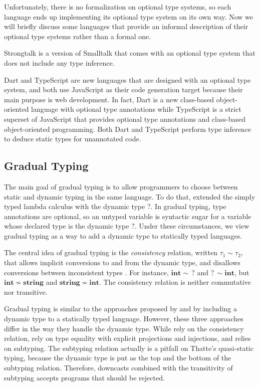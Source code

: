 \documentclass[preprint]{sig-alternate}
\begin{document}
Unfortunately, there is no formalization on optional type systems,
so each language ends up implementing its optional type system on
its own way.
Now we will briefly discuss some languages that provide an informal
description of their optional type systems rather than a formal one.

Strongtalk \citep{bracha1993strongtalk,bracha1996strongtalk} is
a version of Smalltalk that comes with an optional type system that
does not include any type inference.

Dart \citep{dart} and TypeScript \citep{typescript} are new
languages that are designed with an optional type system, and both
use JavaScript as their code generation target because their main
purpose is web development.
In fact, Dart is a new class-based object-oriented language with
optional type annotations while TypeScript is a strict superset of
JavaScript that provides optional type annotations and class-based
object-oriented programming.
Both Dart and TypeScript perform type inference to deduce static
types for unannotated code.

\subsection{Gradual Typing}

The main goal of gradual typing \citep{siek2006gradual} is to allow
programmers to choose between static and dynamic typing in the same
language.
To do that, \citet{siek2006gradual} extended the simply typed
lambda calculus with the dynamic type $?$.
In gradual typing, type annotations are optional, so an untyped
variable is syntactic sugar for a variable whose declared type is
the dynamic type $?$.
Under these circumstances, we view gradual typing as a way to add
a dynamic type to statically typed languages.

The central idea of gradual typing is the \textit{consistency}
relation, written $\tau_{1} \sim \tau_{2}$, that allows implicit
conversions to and from the dynamic type, and disallows conversions
between inconsistent types \citep{siek2006gradual}.
For instance, $\mathbf{int} \sim \,?$ and $?\, \sim \mathbf{int}$,
but $\mathbf{int} \not\sim \mathbf{string}$ and
$\mathbf{string} \not\sim \mathbf{int}$. 
The consistency relation is neither commutative nor transitive.

Gradual typing is similar to the approaches proposed by
\citet{abadi1989dts} and \citet{thatte1990qst} by including a
dynamic type to a statically typed language.
However, these three approaches differ in the way they handle the
dynamic type.
While \citet{siek2006gradual} rely on the consistency relation,
\citet{abadi1989dts} rely on type equality with explicit projections
and injections, and \citet{thatte1990qst} relies on subtyping.
The subtyping relation actually is a pitfall on Thatte's quasi-static
typing, because the dynamic type is put as the top and the bottom of
the subtyping relation.
Therefore, downcasts combined with the transitivity of subtyping
accepts programs that should be rejected.
\end{document}
